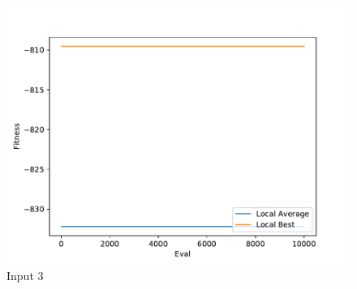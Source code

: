 \documentclass{standalone}
\begin{document}
\begin{figure}[!htb]
	\caption{Input 3}
	\label{fig:graph_3057}
	\includegraphics[width=\textwidth]{../graphs/graphs/3057.pdf}
\end{figure}
\end{document}

